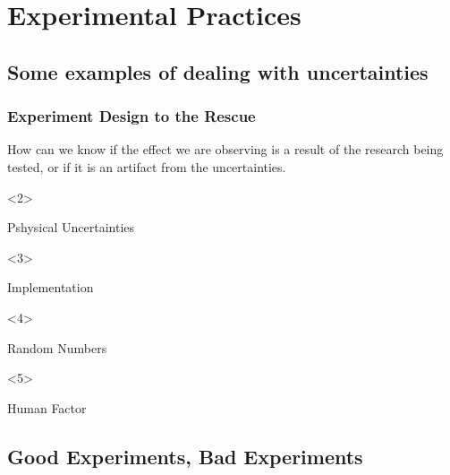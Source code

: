 \documentclass{beamer}
\begin{document}
\section{Experimental Practices} %

\subsection{Some examples of dealing with uncertainties}

\begin{frame}
  \frametitle{Experiment Design to the Rescue}
  \begin{center}
    How can we know if the effect we are observing is a result of the
    research being tested, or if it is an artifact from the
    uncertainties.
  \end{center}

  \begin{onlyenv}<2>
    \begin{block}{Pshysical Uncertainties}
    \end{block}
  \end{onlyenv}
  \begin{onlyenv}<3> %
    \begin{block}{Implementation}
    \end{block}
  \end{onlyenv}
  \begin{onlyenv}<4> %
    \begin{block}{Random Numbers}
    \end{block}
  \end{onlyenv}
  \begin{onlyenv}<5> %
    \begin{block}{Human Factor}
    \end{block}
  \end{onlyenv}
\end{frame}

\subsection{Good Experiments, Bad Experiments}
\end{document}
